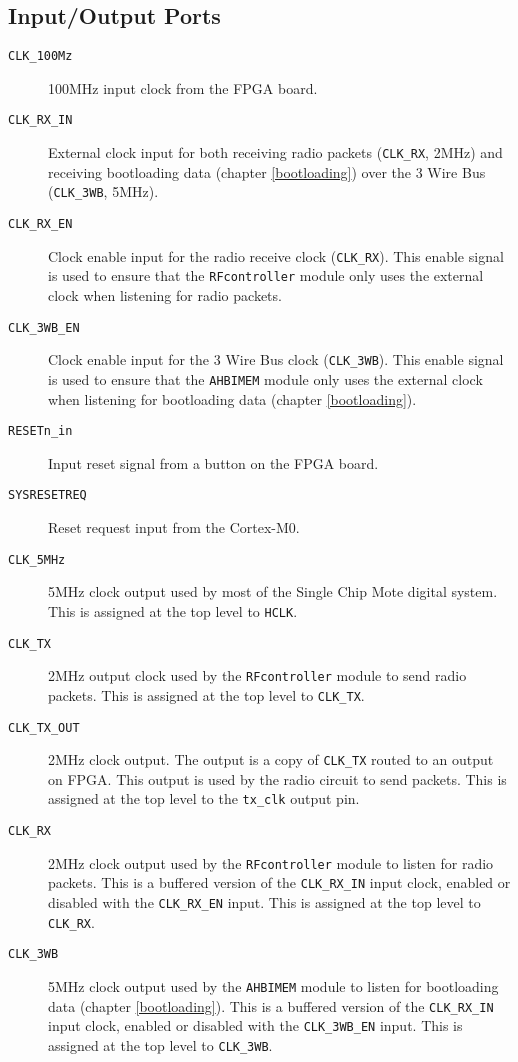 \subsection{Input/Output Ports}
\begin{description}
	\item[\texttt{CLK\_100Mz}] 100MHz input clock from the FPGA board.
	\item[\texttt{CLK\_RX\_IN}] External clock input for both receiving radio packets (\texttt{CLK\_RX}, 2MHz) and receiving bootloading data (chapter \ref{bootloading}) over the 3 Wire Bus (\texttt{CLK\_3WB}, 5MHz).
	\item[\texttt{CLK\_RX\_EN}] Clock enable input for the radio receive clock (\texttt{CLK\_RX}). This enable signal is used to ensure that the \texttt{RFcontroller} module only uses the external clock when listening for radio packets.
	\item[\texttt{CLK\_3WB\_EN}] Clock enable input for the 3 Wire Bus clock (\texttt{CLK\_3WB}). This enable signal is used to ensure that the \texttt{AHBIMEM} module only uses the external clock when listening for bootloading data (chapter \ref{bootloading}).
	\item[\texttt{RESETn\_in}] Input reset signal from a button on the FPGA board.
	\item[\texttt{SYSRESETREQ}] Reset request input from the Cortex-M0.
	\item[\texttt{CLK\_5MHz}] 5MHz clock output used by most of the Single Chip Mote digital system. This is assigned at the top level to \texttt{HCLK}.
	\item[\texttt{CLK\_TX}] 2MHz output clock used by the \texttt{RFcontroller} module to send radio packets. This is assigned at the top level to \texttt{CLK\_TX}.
	\item[\texttt{CLK\_TX\_OUT}] 2MHz clock output. The output is a copy of \texttt{CLK\_TX} routed to an output on FPGA. This output is used by the radio circuit to send packets. This is assigned at the top level to the \texttt{tx\_clk} output pin.
	\item[\texttt{CLK\_RX}] 2MHz clock output used by the \texttt{RFcontroller} module to listen for radio packets. This is a buffered version of the \texttt{CLK\_RX\_IN} input clock, enabled or disabled with the \texttt{CLK\_RX\_EN} input. This is assigned at the top level to \texttt{CLK\_RX}.
	\item[\texttt{CLK\_3WB}] 5MHz clock output used by the \texttt{AHBIMEM} module to listen for bootloading data (chapter \ref{bootloading}). This is a buffered version of the \texttt{CLK\_RX\_IN} input clock, enabled or disabled with the \texttt{CLK\_3WB\_EN} input. This is assigned at the top level to \texttt{CLK\_3WB}.

\end{description}

